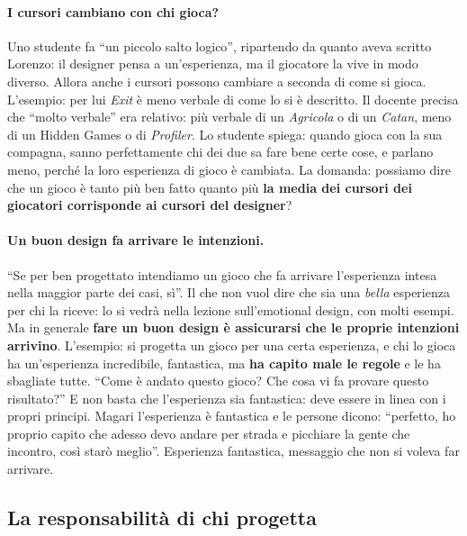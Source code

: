 \paragraph{I cursori cambiano con chi gioca?} Uno studente fa ``un piccolo salto
logico'', ripartendo da quanto aveva scritto Lorenzo: il designer pensa a
un'esperienza, ma il giocatore la vive in modo diverso. Allora anche i cursori
possono cambiare a seconda di come si gioca. L'esempio: per lui \emph{Exit} è
meno verbale di come lo si è descritto. Il docente precisa che ``molto verbale''
era relativo: più verbale di un \emph{Agricola} o di un \emph{Catan}, meno di un
Hidden Games o di \emph{Profiler}. Lo studente spiega: quando gioca con la sua
compagna, sanno perfettamente chi dei due sa fare bene certe cose, e parlano meno,
perché la loro esperienza di gioco è cambiata. La domanda: possiamo dire che un
gioco è tanto più ben fatto quanto più \textbf{la media dei cursori dei
giocatori corrisponde ai cursori del designer}?

\paragraph{Un buon design fa arrivare le intenzioni.} ``Se per ben progettato
intendiamo un gioco che fa arrivare l'esperienza intesa nella maggior parte dei
casi, sì''. Il che non vuol dire che sia una \emph{bella} esperienza per chi la
riceve: lo si vedrà nella lezione sull'emotional design, con molti esempi. Ma in
generale \textbf{fare un buon design è assicurarsi che le proprie intenzioni
arrivino}. L'esempio: si progetta un gioco per una certa esperienza, e chi lo
gioca ha un'esperienza incredibile, fantastica, ma \textbf{ha capito male le
regole} e le ha sbagliate tutte. ``Come è andato questo gioco? Che cosa vi fa
provare questo risultato?'' E non basta che l'esperienza sia fantastica: deve
essere in linea con i propri principi. Magari l'esperienza è fantastica e le
persone dicono: ``perfetto, ho proprio capito che adesso devo andare per strada e
picchiare la gente che incontro, così starò meglio''. Esperienza fantastica,
messaggio che non si voleva far arrivare.

\subsection{La responsabilità di chi progetta}

